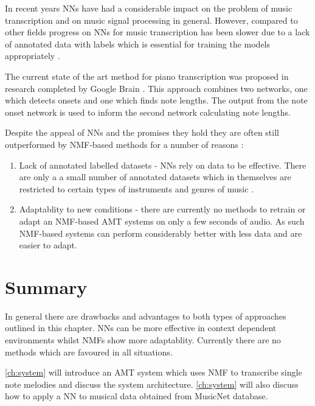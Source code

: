 In recent years \ac{NN}s have had a considerable impact on the problem of music
transcription and on music signal processing in general. However, compared to
other fields progress on \ac{NN}s for music transcription has been slower due to a
lack of annotated data with labels which is essential for training the models
appropriately \cite{end-to-end-transcription2017:Carvalho}.

The current state of the art method for piano transcription was proposed in
research completed by Google Brain \cite{google2018:Elsen}. This approach
combines two networks, one which detects onsets and one which finds note
lengths. The output from the note onset network is used to inform the second
network calculating note lengths.

Despite the appeal of NNs and the promises they hold they are often still
outperformed by \ac{NMF}-based methods for a number of reasons :
\begin{enumerate}
  \item Lack of annotated labelled datasets - \ac{NN}s rely on data to be
        effective. There are only a a small number of annotated datasets which
        in themselves are restricted to certain types of instruments and genres
        of music \cite{ground-truths:Su}.
  \item Adaptablity to new conditions - there are currently no methods to
        retrain or adapt an \ac{NMF}-based \ac{AMT} systems on only a few seconds of audio.
        As such \ac{NMF}-based systems can perform considerably better with less data
        and are easier to adapt.
\end{enumerate}

\section{Summary}

In general there are drawbacks and advantages to both types of approaches
outlined in this chapter. \ac{NN}s can be more effective in context dependent
environments whilst \ac{NMF}s show more adaptablity. Currently there are no methods
which are favoured in all situations.

\autoref{ch:system} will introduce an \ac{AMT} system which uses \ac{NMF} to transcribe
single note melodies and discuss the system architecture. \autoref{ch:system}
will also discuss how to apply a \ac{NN} to musical data obtained from
\citeyear{thickstun2018invariances} MusicNet database.